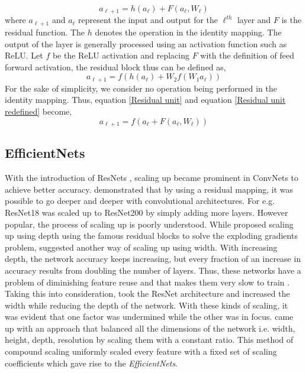 \documentclass[fleqn,usenatbib]{mnras}
\begin{document}
\begin{equation}
    a_{\ell+1} = h(a_\ell) + F(a_\ell, W_\ell)
    \label{Residual unit}
\end{equation}
where $a_{\ell+1}$ and $a_\ell$ represent the input and output for the $\ell^{th}$ layer and $F$ is the residual function. The $h$ denotes the operation in the identity mapping. The output of the layer is generally processed using an activation function such as ReLU. Let $f$ be the ReLU activation and replacing $F$ with the definition of feed forward activation, the residual block thus can be defined as, 
\begin{equation}
    a_{\ell+1} = f(h(a_\ell) + W_2f(W_1a_\ell))
    \label{Residual unit redefined}
\end{equation}
For the sake of simplicity, we consider no operation being performed in the identity mapping. Thus, equation \ref{Residual unit} and equation \ref{Residual unit redefined} become,
\begin{equation}
    a_{\ell+1} = f(a_\ell + F(a_\ell, W_\ell))
    \label{Final Residual notation}
\end{equation}
\subsection{EfficientNets}
\hspace{0.25 in}With the introduction of ResNets \citep{he2016}, scaling up became prominent in ConvNets to achieve better accuracy. \citet{he2016} demonstrated that by using a residual mapping, it was possible to go deeper and deeper with convolutional architectures. For e.g. ResNet18 was scaled up to ResNet200 by simply adding more layers. However popular, the process of scaling up is poorly understood. While \citet{he2016} proposed scaling up using depth using the famous residual blocks to solve the exploding gradients problem, \citet{Zagoruyko_2016} suggested another way of scaling up using width. With increasing depth, the network accuracy keeps increasing, but every fraction of an increase in accuracy results from doubling the number of layers. Thus, these networks have a problem of diminishing feature reuse and that makes them very slow to train \citep{Zagoruyko_2016}. Taking this into consideration, \citet{Zagoruyko_2016} took the ResNet architecture and increased the width while reducing the depth of the network. With these kinds of scaling, it was evident that one factor was undermined while the other was in focus. \citet{tan2019efficientnet} came up with an approach that balanced all the dimensions of the network i.e. width, height, depth, resolution by scaling them with a constant ratio. This method of compound scaling uniformly scaled every feature with a fixed set of scaling coefficients which gave rise to the \textit{EfficientNets}. 
\end{document}
